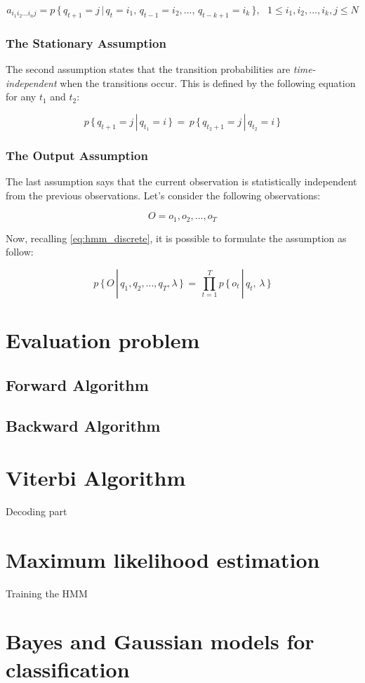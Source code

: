 \begin{equation}
\label{eq:transition_nth_order}
a_{i_{1}i_{2}...i_{n}j} = p\, \{\, q_{t+1} = j \,|\, q_{t} = i_{1}, \, q_{t-1} = i_{2}, ... , \, q_{t-k+1} = i_{k} \, \}, \,\,\,\, 1 \leq i_{1},i_{2}, ... ,i_{k}, j \leq N
\end{equation}


\subsubsection{The Stationary Assumption}
The second assumption states that the transition probabilities are \textit{time-independent} when the transitions occur. This is defined by the following equation for any $t_{1}$ and $t_{2}$:

\begin{equation}
	p \, \{\, q_{t+1} = j \,|\, q_{t_{1}} = i\, \}\, = \,p \,\{\, q_{t_{2}+1} = j \,|\, q_{t_{2}} = i\, \}
\end{equation}

\subsubsection{The Output Assumption}
The last assumption says that the current observation is statistically independent from the previous observations. Let's consider the following observations:

\begin{equation}
	O = o_{1}, o_{2}, ... , o_{T}
\end{equation}

Now, recalling \ref{eq:hmm_discrete}, it is possible to formulate the assumption as follow:

\begin{equation}
	p \, \{\, O \, |\, q_{1},q_{2}, ... , q_{T}, \lambda \,\}\, = \, \prod_{t = 1}^{T} p \, \{ \, o_{t} \, | \, q_{t}, \, \lambda \,\}
\end{equation}

\section{Evaluation problem}


\subsection{Forward Algorithm}


\subsection{Backward Algorithm}


\section{Viterbi Algorithm}
\label{sec:viterbi}
Decoding part

\section{Maximum likelihood estimation}
\label{sec:mle}
Training the HMM



\section{\Naive Bayes and Gaussian models for classification}
\label{sec:Gaussian Classifiers and Distance Measures}
